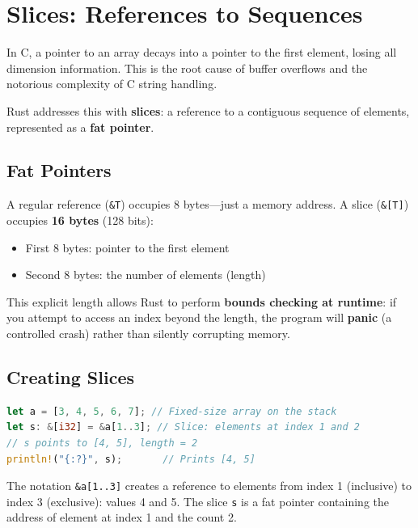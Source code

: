 \section{Slices: References to Sequences}

In C, a pointer to an array decays into a pointer to the first element, losing all dimension information. This is the root cause of buffer overflows and the notorious complexity of C string handling.

Rust addresses this with \textbf{slices}: a reference to a contiguous sequence of elements, represented as a \textbf{fat pointer}.

\subsection{Fat Pointers}

A regular reference (\texttt{\&T}) occupies 8 bytes---just a memory address. A slice (\texttt{\&[T]}) occupies \textbf{16 bytes} (128 bits):

\begin{itemize}
    \item First 8 bytes: pointer to the first element
    \item Second 8 bytes: the number of elements (length)
\end{itemize}

This explicit length allows Rust to perform \textbf{bounds checking at runtime}: if you attempt to access an index beyond the length, the program will \textbf{panic} (a controlled crash) rather than silently corrupting memory.

\subsection{Creating Slices}

\begin{lstlisting}[language=Rust]
let a = [3, 4, 5, 6, 7]; // Fixed-size array on the stack
let s: &[i32] = &a[1..3]; // Slice: elements at index 1 and 2
// s points to [4, 5], length = 2
println!("{:?}", s);       // Prints [4, 5]
\end{lstlisting}

The notation \texttt{\&a[1..3]} creates a reference to elements from index 1 (inclusive) to index 3 (exclusive): values 4 and 5. The slice \texttt{s} is a fat pointer containing the address of element at index 1 and the count 2.

